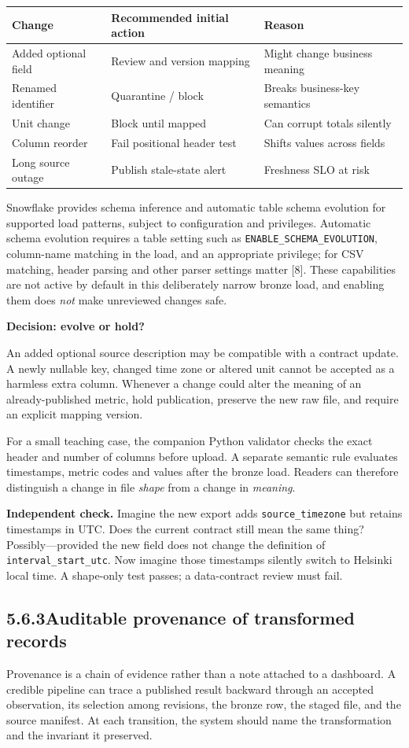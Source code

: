 \documentclass[11pt,twoside]{article}
\newcommand{\topic}[2]{\subsection*{#1\quad #2}}
\begin{document}
\begin{center}\small\begin{tabularx}{\linewidth}{@{}p{25mm}p{42mm}X@{}}\toprule
Change & Recommended initial action & Reason\\\midrule
Added optional field & Review and version mapping & Might change business meaning\\
Renamed identifier & Quarantine / block & Breaks business-key semantics\\
Unit change & Block until mapped & Can corrupt totals silently\\
Column reorder & Fail positional header test & Shifts values across fields\\
Long source outage & Publish stale-state alert & Freshness SLO at risk\\\bottomrule\end{tabularx}\end{center}
Snowflake provides schema inference and automatic table schema evolution for supported load patterns, subject to configuration and privileges. Automatic schema evolution requires a table setting such as \texttt{ENABLE\_SCHEMA\_EVOLUTION}, column-name matching in the load, and an appropriate privilege; for CSV matching, header parsing and other parser settings matter [8]. These capabilities are not active by default in this deliberately narrow bronze load, and enabling them does \emph{not} make unreviewed changes safe.

\begin{insight}\textbf{Decision: evolve or hold?}\par
An added optional source description may be compatible with a contract update. A newly nullable key, changed time zone or altered unit cannot be accepted as a harmless extra column. Whenever a change could alter the meaning of an already-published metric, hold publication, preserve the new raw file, and require an explicit mapping version.\end{insight}
For a small teaching case, the companion Python validator checks the exact header and number of columns before upload. A separate semantic rule evaluates timestamps, metric codes and values after the bronze load. Readers can therefore distinguish a change in file \emph{shape} from a change in \emph{meaning}.

\textbf{Independent check.} Imagine the new export adds \texttt{source\_timezone} but retains timestamps in UTC. Does the current contract still mean the same thing? Possibly---provided the new field does not change the definition of \texttt{interval\_start\_utc}. Now imagine those timestamps silently switch to Helsinki local time. A shape-only test passes; a data-contract review must fail.
\newpage
\topic{5.6.3}{Auditable provenance of transformed records}
Provenance is a chain of evidence rather than a note attached to a dashboard. A credible pipeline can trace a published result backward through an accepted observation, its selection among revisions, the bronze row, the staged file, and the source manifest. At each transition, the system should name the transformation and the invariant it preserved.
\end{document}
